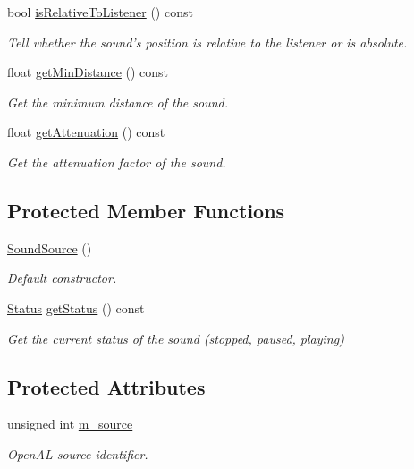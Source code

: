 \begin{DoxyCompactItemize}
bool \hyperlink{classsf_1_1_sound_source_a5cb9107e1c47f65ab82c4885436061ef}{is\-Relative\-To\-Listener} () const 
\begin{DoxyCompactList}\small\item\em Tell whether the sound's position is relative to the listener or is absolute. \end{DoxyCompactList}\item 
float \hyperlink{classsf_1_1_sound_source_a3379b9f7a0f0e31ab9a4e5fa1762986e}{get\-Min\-Distance} () const 
\begin{DoxyCompactList}\small\item\em Get the minimum distance of the sound. \end{DoxyCompactList}\item 
float \hyperlink{classsf_1_1_sound_source_ac5f5ffef8930bb573f43d47cbc779bf6}{get\-Attenuation} () const 
\begin{DoxyCompactList}\small\item\em Get the attenuation factor of the sound. \end{DoxyCompactList}\end{DoxyCompactItemize}
\subsection*{Protected Member Functions}
\begin{DoxyCompactItemize}
\item 
\hyperlink{classsf_1_1_sound_source_aefa4bd4460f387d81a0637d293979436}{Sound\-Source} ()
\begin{DoxyCompactList}\small\item\em Default constructor. \end{DoxyCompactList}\item 
\hyperlink{classsf_1_1_sound_source_ac43af72c98c077500b239bc75b812f03}{Status} \hyperlink{classsf_1_1_sound_source_ad1995d2888773f47f99b671747609dbb}{get\-Status} () const 
\begin{DoxyCompactList}\small\item\em Get the current status of the sound (stopped, paused, playing) \end{DoxyCompactList}\end{DoxyCompactItemize}
\subsection*{Protected Attributes}
\begin{DoxyCompactItemize}
\item 
unsigned int \hyperlink{classsf_1_1_sound_source_a0223cef4b1c587e6e1e17b4c92c4479c}{m\-\_\-source}
\begin{DoxyCompactList}\small\item\em Open\-A\-L source identifier. \end{DoxyCompactList}\end{DoxyCompactItemize}


